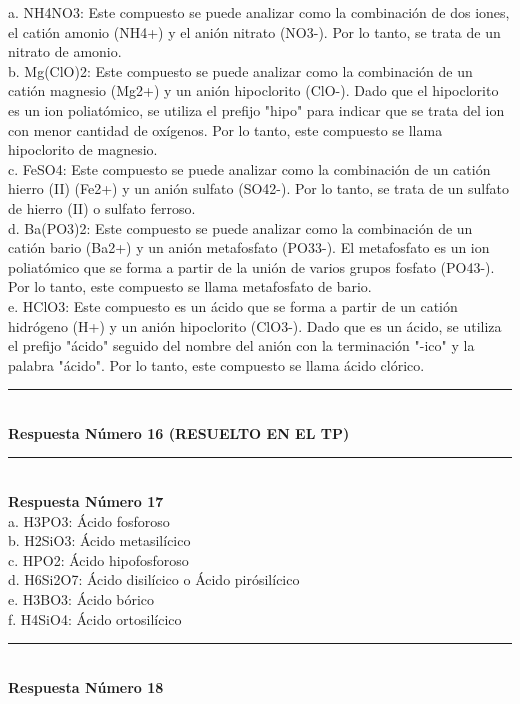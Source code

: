 \documentclass{article}
\begin{document}
a. NH4NO3: Este compuesto se puede analizar como la combinación de dos iones, el catión amonio (NH4+) y el anión nitrato (NO3-). Por lo tanto, se trata de un nitrato de amonio.\\
b. Mg(ClO)2: Este compuesto se puede analizar como la combinación de un catión magnesio (Mg2+) y un anión hipoclorito (ClO-). Dado que el hipoclorito es un ion poliatómico, se utiliza el prefijo "hipo" para indicar que se trata del ion con menor cantidad de oxígenos. Por lo tanto, este compuesto se llama hipoclorito de magnesio.\\
c. FeSO4: Este compuesto se puede analizar como la combinación de un catión hierro (II) (Fe2+) y un anión sulfato (SO42-). Por lo tanto, se trata de un sulfato de hierro (II) o sulfato ferroso.\\
d. Ba(PO3)2: Este compuesto se puede analizar como la combinación de un catión bario (Ba2+) y un anión metafosfato (PO33-). El metafosfato es un ion poliatómico que se forma a partir de la unión de varios grupos fosfato (PO43-). Por lo tanto, este compuesto se llama metafosfato de bario.\\
e. HClO3: Este compuesto es un ácido que se forma a partir de un catión hidrógeno (H+) y un anión hipoclorito (ClO3-). Dado que es un ácido, se utiliza el prefijo "ácido" seguido del nombre del anión con la terminación "-ico" y la palabra "ácido". Por lo tanto, este compuesto se llama ácido clórico.\\
\noindent\rule{\textwidth}{1pt} \\
\textbf{Respuesta Número 16 (RESUELTO EN EL TP)} \\
\noindent\rule{\textwidth}{1pt} \\
\textbf{Respuesta Número 17} \\
a. H3PO3: Ácido fosforoso\\
b. H2SiO3: Ácido metasilícico\\
c. HPO2: Ácido hipofosforoso\\
d. H6Si2O7: Ácido disilícico o Ácido pirósilícico\\
e. H3BO3: Ácido bórico\\
f. H4SiO4: Ácido ortosilícico\\
\noindent\rule{\textwidth}{1pt} \\
\textbf{Respuesta Número 18} \\
\end{document}
